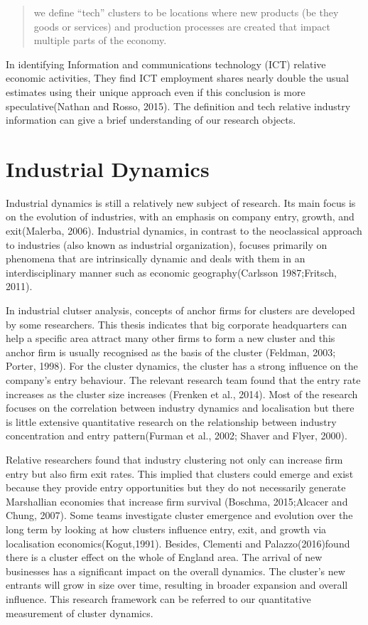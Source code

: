 \documentclass[
  12pt,
  oneside]{book}
\begin{document}
\begin{quote}
we define ``tech'' clusters to be locations where new products (be they goods or services) and production processes are created that impact multiple parts of the economy.
\end{quote}

In identifying Information and communications technology (ICT) relative economic activities, They find ICT employment shares nearly double the usual estimates using their unique approach even if this conclusion is more speculative(Nathan and Rosso, 2015). The definition and tech relative industry information can give a brief understanding of our research objects.

\hypertarget{industrial-dynamics}{%
\section{Industrial Dynamics}\label{industrial-dynamics}}

Industrial dynamics is still a relatively new subject of research. Its main focus is on the evolution of industries, with an emphasis on company entry, growth, and exit(Malerba, 2006). Industrial dynamics, in contrast to the neoclassical approach to industries (also known as industrial organization), focuses primarily on phenomena that are intrinsically dynamic and deals with them in an interdisciplinary manner such as economic geography(Carlsson 1987;Fritsch, 2011).

In industrial clutser analysis, concepts of anchor firms for clusters are developed by some researchers. This thesis indicates that big corporate headquarters can help a specific area attract many other firms to form a new cluster and this anchor firm is usually recognised as the basis of the cluster (Feldman, 2003; Porter, 1998). For the cluster dynamics, the cluster has a strong influence on the company's entry behaviour. The relevant research team found that the entry rate increases as the cluster size increases (Frenken et al., 2014). Most of the research focuses on the correlation between industry dynamics and localisation but there is little extensive quantitative research on the relationship between industry concentration and entry pattern(Furman et al., 2002; Shaver and Flyer, 2000).

Relative researchers found that industry clustering not only can increase firm entry but also firm exit rates. This implied that clusters could emerge and exist because they provide entry opportunities but they do not necessarily generate Marshallian economies that increase firm survival (Boschma, 2015;Alcacer and Chung, 2007). Some teams investigate cluster emergence and evolution over the long term by looking at how clusters influence entry, exit, and growth via localisation economics(Kogut,1991). Besides, Clementi and Palazzo(2016)found there is a cluster effect on the whole of England area. The arrival of new businesses has a significant impact on the overall dynamics. The cluster's new entrants will grow in size over time, resulting in broader expansion and overall influence. This research framework can be referred to our quantitative measurement of cluster dynamics.
\end{document}
